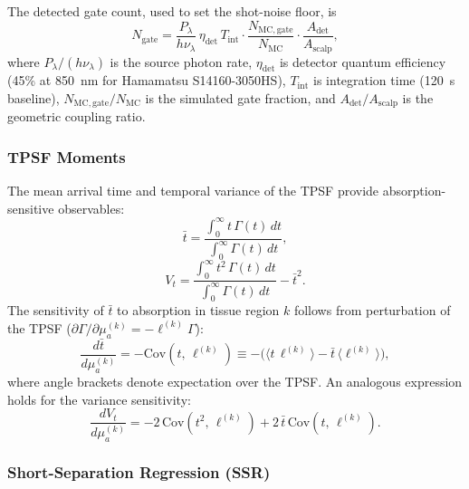 \documentclass[11pt,a4paper]{article}
\begin{document}
The detected gate count, used to set the shot-noise floor, is
\begin{equation}
    N_\mathrm{gate} = \frac{P_\lambda}{h\nu_\lambda}\,\eta_\mathrm{det}\,T_\mathrm{int}
    \cdot\frac{N_\mathrm{MC,gate}}{N_\mathrm{MC}}\cdot\frac{A_\mathrm{det}}{A_\mathrm{scalp}},
    \label{eq:ngate}
\end{equation}
where $P_\lambda/(h\nu_\lambda)$ is the source photon rate, $\eta_\mathrm{det}$ is detector quantum efficiency (45\% at 850~nm for Hamamatsu S14160-3050HS), $T_\mathrm{int}$ is integration time (120~s baseline), $N_\mathrm{MC,gate}/N_\mathrm{MC}$ is the simulated gate fraction, and $A_\mathrm{det}/A_\mathrm{scalp}$ is the geometric coupling ratio.

\subsubsection*{TPSF Moments}

The mean arrival time and temporal variance of the TPSF provide absorption-sensitive observables:
\begin{equation}
    \bar{t} = \frac{\displaystyle\int_0^{\infty} t\,\Gamma(t)\,dt}
                   {\displaystyle\int_0^{\infty} \Gamma(t)\,dt},
    \label{eq:tmean}
\end{equation}
\begin{equation}
    V_t = \frac{\displaystyle\int_0^{\infty} t^2\,\Gamma(t)\,dt}
               {\displaystyle\int_0^{\infty} \Gamma(t)\,dt} - \bar{t}^2.
    \label{eq:tvar}
\end{equation}
The sensitivity of $\bar{t}$ to absorption in tissue region $k$ follows from perturbation of the TPSF ($\partial\Gamma/\partial\mu_a^{(k)} = -\ell^{(k)}\Gamma$):
\begin{equation}
    \frac{d\bar{t}}{d\mu_a^{(k)}} = -\mathrm{Cov}\!\left(t,\,\ell^{(k)}\right)
    \equiv -\bigl(\langle t\,\ell^{(k)}\rangle - \bar{t}\,\langle\ell^{(k)}\rangle\bigr),
    \label{eq:moment_sens}
\end{equation}
where angle brackets denote expectation over the TPSF. An analogous expression holds for the variance sensitivity:
\begin{equation}
    \frac{dV_t}{d\mu_a^{(k)}} =
    -2\,\mathrm{Cov}\!\left(t^2,\,\ell^{(k)}\right)
    + 2\,\bar{t}\,\mathrm{Cov}\!\left(t,\,\ell^{(k)}\right).
    \label{eq:var_sens}
\end{equation}

\subsubsection*{Short-Separation Regression (SSR)}
\end{document}
